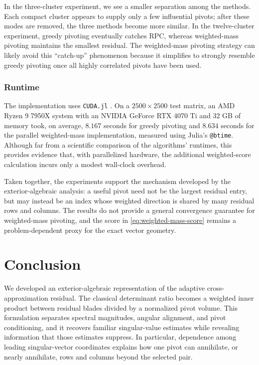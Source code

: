 \documentclass[11pt, preprint]{article}
\begin{document}
In the three-cluster experiment, we see a smaller separation among the methods. Each compact cluster appears to supply only a few  influential pivots; after these modes are removed, the three methods become more similar. In the twelve-cluster experiment, greedy pivoting eventually catches RPC, whereas weighted-mass pivoting maintains the smallest  residual. The weighted-mass pivoting strategy can likely avoid this ``catch-up'' phenomenon because it simplifies to strongly resemble greedy pivoting once all highly correlated pivots have been used. 

\subsubsection{Runtime}

The implementation uses \lstinline{CUDA.jl}
\cite{besard2018juliagpu}. On a $2500\times2500$ test matrix, an AMD Ryzen 9
7950X system with an NVIDIA GeForce RTX 4070 Ti and 32 GB of memory took,
on average, $8.167$ seconds for greedy pivoting and $8.634$ seconds for the
parallel weighted-mass implementation, measured using Julia's
\lstinline{@btime}. Although far from a scientific comparison of the algorithms' runtimes, this provides evidence that, with parallelized hardware, the additional weighted-score
calculation incurs only a modest wall-clock overhead.

Taken together, the experiments support the mechanism developed by the
exterior-algebraic analysis: a useful pivot need not be the largest residual
entry, but may instead be an index whose weighted direction is shared by many
residual rows and columns. The results do not provide a general convergence
guarantee for weighted-mass pivoting, and the score in
\eqref{eq:weighted-mass-score} remains a problem-dependent proxy for the
exact vector geometry.

\section{Conclusion}

We developed an exterior-algebraic representation of the adaptive cross-approximation residual. The classical determinant ratio becomes a weighted inner product between residual blades divided by a normalized pivot volume. This formulation separates spectral magnitudes, angular alignment, and pivot conditioning, and it recovers familiar singular-value estimates while revealing information that those estimates suppress. In particular, dependence among leading singular-vector coordinates explains how one pivot can annihilate, or nearly annihilate, rows and columns beyond the selected pair.
\end{document}
